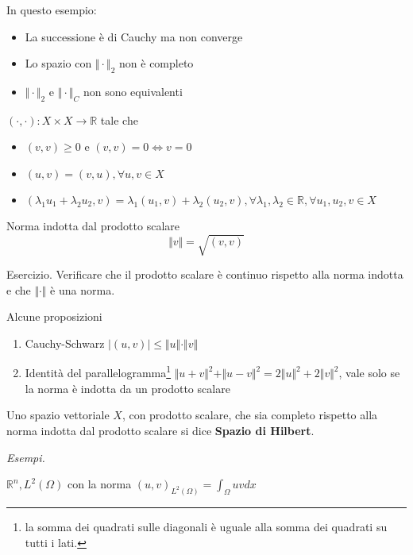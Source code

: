 \documentclass[10pt,a4paper,twoside,openright]{book}
\begin{document}
In questo esempio:
\begin{itemize}
\item La successione è di Cauchy ma non converge
\item Lo spazio con $\Vert \cdotp \Vert _{2}$ non è completo
\item $\Vert \cdotp \Vert _{2}$ e $\Vert \cdotp \Vert _{C}$ non sono equivalenti
\end{itemize}
\begin{definition}
 $(\cdotp,\cdotp) :X\times X\rightarrow \mathbb{R}$ tale che
\begin{itemize}
\item $(v,v) \geqslant 0$ e $(v,v) =0\Leftrightarrow v=0$
\item $(u,v) =(v,u),\forall u,v\in X$
\item $( \lambda _{1} u_{1} +\lambda _{2} u_{2},v) =\lambda _{1}(u_{1},v) +\lambda _{2}(u_{2},v),\forall \lambda _{1},\lambda _{2} \in \mathbb{R},\forall u_{1},u_{2},v\in X$
\end{itemize}
\end{definition}
\begin{definition}
Norma indotta dal prodotto scalare
\begin{equation*}
\Vert v\Vert =\sqrt{(v,v)}
\end{equation*}
\end{definition}
Esercizio. Verificare che il prodotto scalare è continuo rispetto alla norma indotta e che $\Vert \cdotp \Vert $ è una norma.
\begin{theorem}
Alcune proposizioni
\begin{enumerate}
\item Cauchy-Schwarz $| (u,v)| \leqslant \Vert u\Vert \cdotp \Vert v\Vert $
\item Identità del parallelogramma\footnote{la somma dei quadrati sulle diagonali è uguale alla somma dei quadrati su tutti i lati.} $\Vert u+v\Vert ^{2} +\Vert u-v\Vert ^{2} =2\Vert u\Vert ^{2} +2\Vert v\Vert ^{2}$, vale solo se la norma è indotta da un prodotto scalare
\end{enumerate}
\end{theorem}
\begin{definition}
Uno spazio vettoriale $X$, con prodotto scalare, che sia completo rispetto alla norma indotta dal prodotto scalare si dice \textbf{Spazio di Hilbert}.
\end{definition}
\textit{Esempi.}

$\mathbb{R}^{n},L^{2}(\Omega)$ con la norma $(u,v)_{L^{2}(\Omega)} =\int _{\Omega } uvdx$
\end{document}
